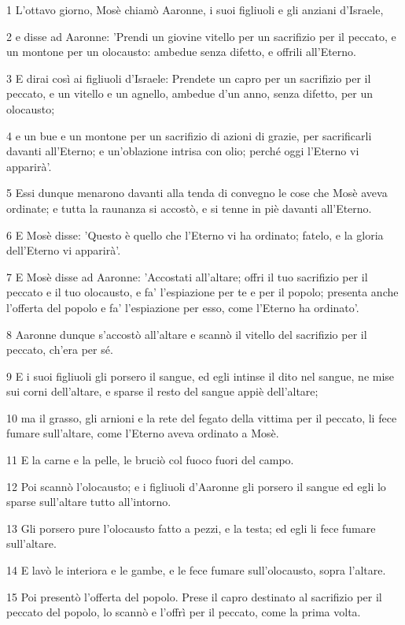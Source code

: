 \par 1 L'ottavo giorno, Mosè chiamò Aaronne, i suoi figliuoli e gli anziani d'Israele,
\par 2 e disse ad Aaronne: 'Prendi un giovine vitello per un sacrifizio per il peccato, e un montone per un olocausto: ambedue senza difetto, e offrili all'Eterno.
\par 3 E dirai così ai figliuoli d'Israele: Prendete un capro per un sacrifizio per il peccato, e un vitello e un agnello, ambedue d'un anno, senza difetto, per un olocausto;
\par 4 e un bue e un montone per un sacrifizio di azioni di grazie, per sacrificarli davanti all'Eterno; e un'oblazione intrisa con olio; perché oggi l'Eterno vi apparirà'.
\par 5 Essi dunque menarono davanti alla tenda di convegno le cose che Mosè aveva ordinate; e tutta la raunanza si accostò, e si tenne in piè davanti all'Eterno.
\par 6 E Mosè disse: 'Questo è quello che l'Eterno vi ha ordinato; fatelo, e la gloria dell'Eterno vi apparirà'.
\par 7 E Mosè disse ad Aaronne: 'Accostati all'altare; offri il tuo sacrifizio per il peccato e il tuo olocausto, e fa' l'espiazione per te e per il popolo; presenta anche l'offerta del popolo e fa' l'espiazione per esso, come l'Eterno ha ordinato'.
\par 8 Aaronne dunque s'accostò all'altare e scannò il vitello del sacrifizio per il peccato, ch'era per sé.
\par 9 E i suoi figliuoli gli porsero il sangue, ed egli intinse il dito nel sangue, ne mise sui corni dell'altare, e sparse il resto del sangue appiè dell'altare;
\par 10 ma il grasso, gli arnioni e la rete del fegato della vittima per il peccato, li fece fumare sull'altare, come l'Eterno aveva ordinato a Mosè.
\par 11 E la carne e la pelle, le bruciò col fuoco fuori del campo.
\par 12 Poi scannò l'olocausto; e i figliuoli d'Aaronne gli porsero il sangue ed egli lo sparse sull'altare tutto all'intorno.
\par 13 Gli porsero pure l'olocausto fatto a pezzi, e la testa; ed egli li fece fumare sull'altare.
\par 14 E lavò le interiora e le gambe, e le fece fumare sull'olocausto, sopra l'altare.
\par 15 Poi presentò l'offerta del popolo. Prese il capro destinato al sacrifizio per il peccato del popolo, lo scannò e l'offrì per il peccato, come la prima volta.
